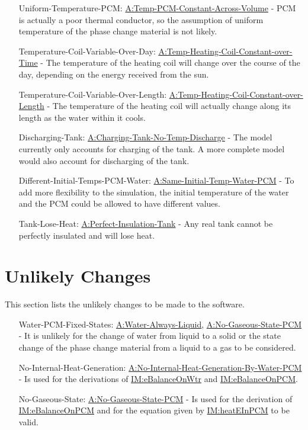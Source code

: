 \documentclass[12pt]{article}
\begin{document}
\begin{itemize}
\item[Uniform-Temperature-PCM:\phantomsection\label{likeChgUTP}]{\hyperref[assumpTPCAV]{A:Temp-PCM-Constant-Across-Volume} - PCM is actually a poor thermal conductor, so the assumption of uniform temperature of the phase change material is not likely.}
\item[Temperature-Coil-Variable-Over-Day:\phantomsection\label{likeChgTCVOD}]{\hyperref[assumpTHCCoT]{A:Temp-Heating-Coil-Constant-over-Time} - The temperature of the heating coil will change over the course of the day, depending on the energy received from the sun.}
\item[Temperature-Coil-Variable-Over-Length:\phantomsection\label{likeChgTCVOL}]{\hyperref[assumpTHCCoL]{A:Temp-Heating-Coil-Constant-over-Length} - The temperature of the heating coil will actually change along its length as the water within it cools.}
\item[Discharging-Tank:\phantomsection\label{likeChgDT}]{\hyperref[assumpCTNOD]{A:Charging-Tank-No-Temp-Discharge} - The model currently only accounts for charging of the tank. A more complete model would also account for discharging of the tank.}
\item[Different-Initial-Temps-PCM-Water:\phantomsection\label{likeChgDITPW}]{\hyperref[assumpSITWP]{A:Same-Initial-Temp-Water-PCM} - To add more flexibility to the simulation, the initial temperature of the water and the PCM could be allowed to have different values.}
\item[Tank-Lose-Heat:\phantomsection\label{likeChgTLH}]{\hyperref[assumpPIT]{A:Perfect-Insulation-Tank} - Any real tank cannot be perfectly insulated and will lose heat.}
\end{itemize}
\section{Unlikely Changes}
\label{Sec:UCs}
This section lists the unlikely changes to be made to the software.

\begin{itemize}
\item[Water-PCM-Fixed-States:\phantomsection\label{unlikeChgWPFS}]{\hyperref[assumpWAL]{A:Water-Always-Liquid}, \hyperref[assumpNGSP]{A:No-Gaseous-State-PCM} - It is unlikely for the change of water from liquid to a solid or the state change of the phase change material from a liquid to a gas to be considered.}
\item[No-Internal-Heat-Generation:\phantomsection\label{unlikeChgNIHG}]{\hyperref[assumpNIHGBWP]{A:No-Internal-Heat-Generation-By-Water-PCM} - Is used for the derivations of \hyperref[IM:eBalanceOnWtr]{IM:eBalanceOnWtr} and \hyperref[IM:eBalanceOnPCM]{IM:eBalanceOnPCM}.}
\item[No-Gaseous-State:\phantomsection\label{unlikeChgNGS}]{\hyperref[assumpNGSP]{A:No-Gaseous-State-PCM} - Is used for the derivation of \hyperref[IM:eBalanceOnPCM]{IM:eBalanceOnPCM} and for the equation given by \hyperref[IM:heatEInPCM]{IM:heatEInPCM} to be valid.}
\end{itemize}
\end{document}

